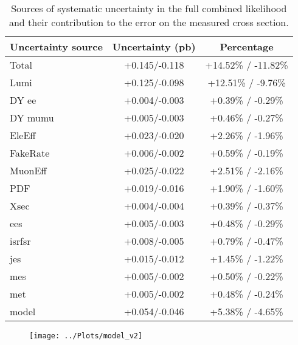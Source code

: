 \documentclass[11pt]{article}
\begin{document}
\begin{table}[htbp]
  \begin{center}
    \begin{tabular}{|l|c|c|} \hline
      Uncertainty source & Uncertainty (pb) & Percentage \\
      \hline
      \hline
      Total & +0.145/-0.118 & +14.52\% / -11.82\% \\
      \hline
      Lumi &  +0.125/-0.098 & +12.51\% / -9.76\% \\
      DY ee &  +0.004/-0.003 & +0.39\% / -0.29\% \\
      DY mumu & +0.005/-0.003 & +0.46\% / -0.27\% \\
      EleEff &  +0.023/-0.020 & +2.26\% / -1.96\% \\
      FakeRate & +0.006/-0.002 & +0.59\% / -0.19\% \\
      MuonEff & +0.025/-0.022 & +2.51\% / -2.16\% \\
      PDF & +0.019/-0.016 & +1.90\% / -1.60\% \\
      Xsec & +0.004/-0.004 & +0.39\% / -0.37\% \\
      ees & +0.005/-0.003 & +0.48\% / -0.29\% \\
      isrfsr & +0.008/-0.005 & +0.79\% / -0.47\% \\
      jes & +0.015/-0.012 & +1.45\% / -1.22\% \\
      mes & +0.005/-0.002 & +0.50\% / -0.22\% \\
      met & +0.005/-0.002 & +0.48\% / -0.24\% \\
      model &  +0.054/-0.046 & +5.38\% / -4.65\% \\
      \hline
    \end{tabular}
  \end{center}
  \caption{\label{tab:importantSystematics}
    Sources of systematic uncertainty in the full combined likelihood 
    and their contribution to the error on the measured cross section.
  }
\end{table}
\clearpage
\newpage


\begin{figure}[htbp]
  \begin{center}
    \texttt{[image: ../Plots/model\_v2]}
  \end{center}
\end{figure}
\clearpage
\newpage
\end{document}
